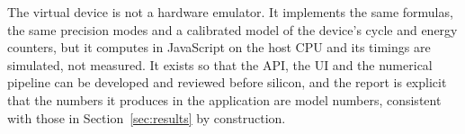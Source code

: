 The virtual device is not a hardware emulator. It implements the same formulas, the same
precision modes and a calibrated model of the device's cycle and energy counters, but it computes
in JavaScript on the host CPU and its timings are simulated, not measured. It exists so that the
API, the UI and the numerical pipeline can be developed and reviewed before silicon, and the
report is explicit that the numbers it produces in the application are model numbers, consistent
with those in Section~\ref{sec:results} by construction.
